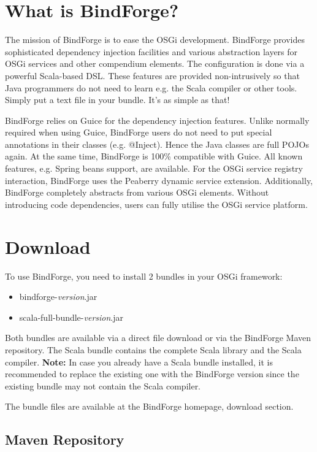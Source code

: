 
\section{What is BindForge?}

The mission of BindForge is to ease the OSGi development. BindForge provides sophisticated dependency injection facilities and various abstraction layers for OSGi services and other compendium elements. The configuration is done via a powerful Scala-based DSL. These features are provided non-intrusively so that Java programmers do not need to learn e.g. the Scala compiler or other tools. Simply put a text file in your bundle. It's as simple as that!

BindForge relies on Guice for the dependency injection features. Unlike normally required when using Guice, BindForge users do not need to put special annotations in their classes (e.g. @Inject). Hence the Java classes are full POJOs again. At the same time, BindForge is 100\% compatible with Guice. All known features, e.g. Spring beans support, are available. For the OSGi service registry interaction, BindForge uses the Peaberry dynamic service extension. Additionally, BindForge completely abstracts from various OSGi elements. Without introducing code dependencies, users can fully utilise the OSGi service platform. 


\section{Download}

To use BindForge, you need to install 2 bundles in your OSGi framework:

\begin{itemize}
 \item bindforge-\textit{version}.jar
 \item scala-full-bundle-\textit{version}.jar
\end{itemize}

Both bundles are available via a direct file download or via the BindForge Maven repository. The Scala bundle contains the complete Scala library and the Scala compiler. \textbf{Note:} In case you already have a Scala bundle installed, it is recommended to replace the existing one with the BindForge version since the existing bundle may not contain the Scala compiler.

The bundle files are available at the BindForge homepage, download section.

\subsection{Maven Repository}

